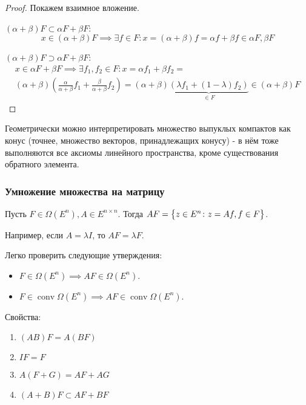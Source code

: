 \begin{proof}
    Покажем взаимное вложение.

    $(\alpha + \beta) F \subset \alpha F + \beta F$:
        \begin{equation*}
            x \in (\alpha + \beta) F \implies 
            \exists f \in F\colon 
            x = (\alpha + \beta)f = 
            \alpha f + \beta f \in \alpha F, \beta F
        \end{equation*}

    $(\alpha + \beta) F \supset \alpha F + \beta F$:
        \begin{multline*}
        x \in \alpha F + \beta F \implies
        \exists f_1, f_2 \in F\colon
        x = \alpha f_1 + \beta f_2 = \\
        (\alpha + \beta) \left( \frac{\alpha}{\alpha + \beta} f_1 + \frac{\beta}{\alpha + \beta} f_2\right) =
        (\alpha + \beta)\underbrace{(\lambda f_1 + (1 - \lambda) f_2)}_{\in F} \in (\alpha + \beta) F
        \end{multline*}
    
\end{proof}

Геометрически можно интерпретировать множество выпуклых компактов как конус (точнее, множество векторов, принадлежащих конусу) - 
в нём тоже выполняются все аксиомы линейного пространства, кроме существования обратного элемента.

\subsubsection{Умножение множества на матрицу}
\begin{defn}
    Пусть $F \in \Omega(E^{n}), A \in E^{n \times n}$.
    Тогда $A F = \bigl\{ z \in E^n\colon z = Af, f \in F \bigr\}$.
\end{defn}

Например, если $A = \lambda I$, то $AF = \lambda F$.

Легко проверить следующие утверждения:
\begin{itemize}
    \item $F \in \Omega(E^n) \implies A F \in \Omega(E^n)$.
    \item $F \in \operatorname{conv} \Omega(E^n) \implies A F \in \operatorname{conv} \Omega(E^n)$.
\end{itemize}

Свойства:
\begin{enumerate}
    \item $(A B) F = A(BF)$
    \item $I F = F$
    \item $A (F + G) = AF + AG$
    \item $(A + B)F \subset AF + BF$
\end{enumerate}

